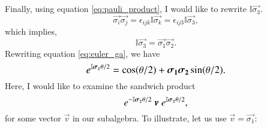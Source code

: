 \\ \\
Finally, using equation \eqref{eq:pauli_product}, I would like to rewrite  $\mathbb{I} \vec{\sigma_3}$.
$$ \vec{\sigma_i} \vec{\sigma_j} = \epsilon_{ijk} \mathbb{I} \vec{\sigma_k} = \epsilon_{ij3} \mathbb{I} \vec{\sigma_3},$$
which implies,
$$ \mathbb{I} \vec{\sigma_3 } = \vec{\sigma_1 } \vec{\sigma_2 }. $$
Rewriting equation \eqref{eq:euler_ga}, we have
\begin{equation} \label{eq:euler_ga_rewritten}
	\large  \exp{ \mathbb{I} \vec{\sigma_z} \theta / 2} = \cos(\theta/2) + \vec{\sigma_1} \vec{\sigma_2} \sin(\theta/2).
\end{equation}
Here, I would like to examine the sandwich product
\begin{equation} \label{eq:sandwich_product}
	\large  \exp{ -\mathbb{I} \vec{\sigma_z}  \theta / 2} \ \vec{v}  \
	\exp{ \mathbb{I} \vec{\sigma_z} \theta / 2},
\end{equation}
for some vector $\vec{v}$ in our subalgebra. To illustrate, let us use $\vec{v} =  \vec{\sigma_1}$:
